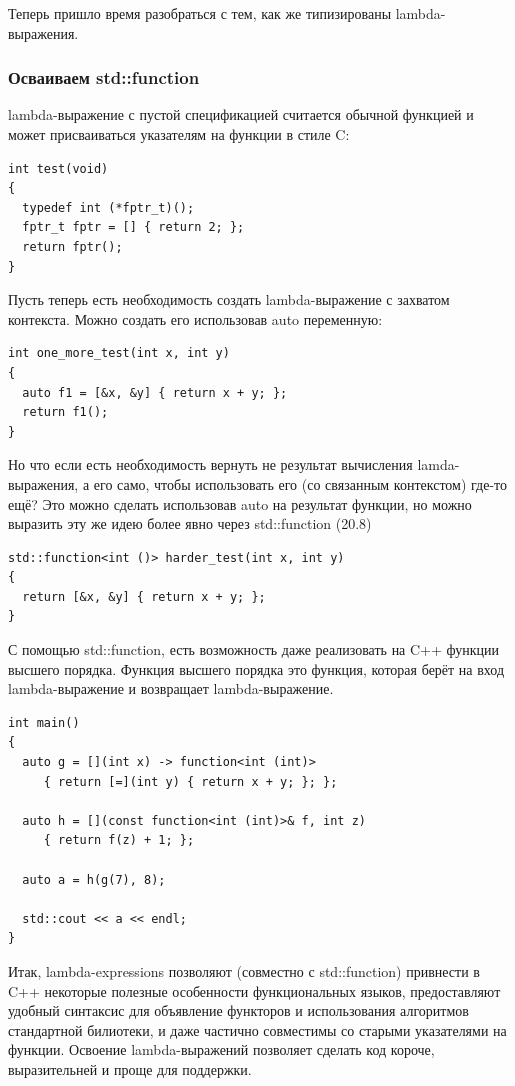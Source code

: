 \documentclass[a4paper,12pt,oneside]{article}
\begin{document}
Теперь пришло время разобраться с тем, как же типизированы lambda-выражения.

\subsubsection{Осваиваем std::function}

lambda-выражение с пустой спецификацией считается обычной функцией и может присваиваться указателям на функции в стиле C:

\begin{lstlisting}
int test(void)
{
  typedef int (*fptr_t)();
  fptr_t fptr = [] { return 2; };
  return fptr();
}
\end{lstlisting}

Пусть теперь есть необходимость создать lambda-выражение с захватом контекста. Можно создать его использовав auto переменную:

\begin{lstlisting}
int one_more_test(int x, int y)
{
  auto f1 = [&x, &y] { return x + y; };
  return f1(); 
}
\end{lstlisting}

Но что если есть необходимость вернуть не результат вычисления lamda-выражения, а его само, чтобы использовать его (со связанным контекстом) где-то ещё? Это можно сделать использовав auto на результат функции, но можно выразить эту же идею более явно через std::function (20.8)
 
\begin{lstlisting}
std::function<int ()> harder_test(int x, int y)
{
  return [&x, &y] { return x + y; };
}
\end{lstlisting}

С помощью std::function, есть возможность даже реализовать на C++ функции высшего порядка. Функция высшего порядка это функция, которая берёт на вход lambda-выражение и возвращает lambda-выражение.

\begin{lstlisting}
int main()
{
  auto g = [](int x) -> function<int (int)> 
     { return [=](int y) { return x + y; }; };

  auto h = [](const function<int (int)>& f, int z) 
     { return f(z) + 1; };

  auto a = h(g(7), 8);

  std::cout << a << endl;
}
\end{lstlisting}

Итак, lambda-expressions позволяют (совместно с std::function) привнести в C++ некоторые полезные особенности функциональных языков, предоставляют удобный синтаксис для объявление функторов и использования алгоритмов стандартной билиотеки, и даже частично совместимы со старыми указателями на функции. Освоение lambda-выражений позволяет сделать код короче, выразительней и проще для поддержки.
\end{document}
